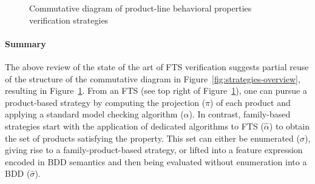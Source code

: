 \begin{figure}[!htbp]
	\caption{Commutative diagram of product-line behavioral properties  verification strategies}
	\label{fig:diagram-FTS}
\end{figure}

\paragraph{Summary}
The above review of the state of the art of FTS verification suggests partial reuse of the structure of the commutative diagram in Figure~\ref{fig:strategies-overview}, resulting in Figure~\ref{fig:diagram-FTS}. From an FTS (see top right of Figure~\ref{fig:diagram-FTS}), one can pursue a product-based strategy by computing the projection ($\pi$) of each product and applying a standard model checking algorithm ($\alpha$). In contrast, family-based strategies start with the application of dedicated algorithms to FTS ($\hat{\alpha}$) to obtain the set of products satisfying the property. This set can either be enumerated ($\sigma$), giving rise to a family-product-based strategy, or lifted into a feature expression encoded in BDD semantics and then being evaluated without enumeration into a BDD ($\hat{\sigma}$).

